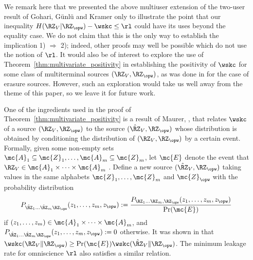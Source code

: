 {We remark here that we presented the above multiuser extension of the two-user result of Gohari, G\"unl\"u and Kramer \cite[Theorem 4]{amin2020} only to illustrate the point that our inequality $H(\RZ_V|\RZ_{\opw}) - \wskc \leq \rl$ could have its uses beyond the equality case. We do not claim that this is the only way to establish the implication 1) $\Longrightarrow$ 2); indeed, other proofs may well be possible which do not use the notion of $\rl$. It would also be of interest to explore the use of Theorem~\ref{thm:multivariate_positivity} in establishing the positivity of $\wskc$ for some class of multiterminal sources $(\RZ_V, \RZ_{\opw})$, as was done in \cite{amin2020} for the case of erasure sources. However, such an exploration would take us well away from the theme of this paper, so we leave it for future work.

One of the ingredients used in the proof of Theorem~\ref{thm:multivariate_positivity} is a result of Maurer, \cite[Lemma~3]{maurer93}, 
that relates $\wskc$ of a source $(\RZ_V,\RZ_{\opw})$ to the source $(\hat{\RZ}_V,\RZ_{\opw})$ whose distribution is obtained by conditioning the distribution of $(\RZ_V,\RZ_{\opw})$ by a certain event. Formally, given some non-empty sets $\mc{A}_1 \subseteq \mc{Z}_1, \ldots, \mc{A}_m \subseteq \mc{Z}_m$, let $\mc{E}$ denote the event that $\RZ_V \in \mc{A}_{1}\times\cdots\times\mc{A}_{m}$ . Define a new source $(\hat{\RZ}_V,\RZ_{\opw})$ taking values in the same alphabets $\mc{Z}_1, \ldots, \mc{Z}_m$ and $\mc{Z}_{\opw}$ with the probability distribution
\begin{align}\label{eq:hatsource}
    P_{\hat{\RZ}_1 \ldots \hat{\RZ}_m \RZ_{\opw}}(z_1, \ldots, z_m, z_{\opw}) := \dfrac{P_{\RZ_1 \ldots \RZ_m, \RZ_{\opw}}(z_1, \ldots, z_m, z_{\opw})}{\Pr(\mc{E})}
\end{align}
if $(z_1, \ldots, z_m) \in \mc{A}_{1}\times\cdots\times\mc{A}_{m}$, and $P_{\hat{\RZ}_1 \ldots \hat{\RZ}_m \RZ_{\opw}}(z_1, \ldots, z_m, z_{\opw}) := 0$ otherwise.
It was shown in \cite[Lemma~3]{maurer93} that  $\wskc(\RZ_V\|\RZ_{\opw})\geq\Pr(\mc{E})\wskc(\hat{\RZ}_V\|\RZ_{\opw})$. The minimum leakage rate for omniscience $\rl$ also satisfies a similar relation.

}
